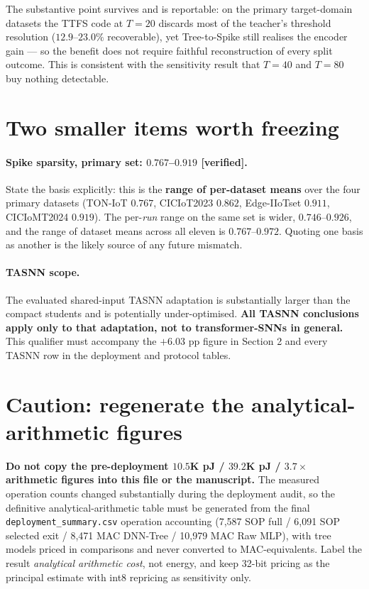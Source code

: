 \noindent The substantive point survives and is reportable: on the primary target-domain
datasets the TTFS code at $T=20$ discards most of the teacher's threshold resolution
($12.9$--$23.0\%$ recoverable), yet Tree-to-Spike still realises the encoder gain --- so
the benefit does not require faithful reconstruction of every split outcome. This is
consistent with the sensitivity result that $T=40$ and $T=80$ buy nothing detectable.

\section*{Two smaller items worth freezing}

\paragraph{Spike sparsity, primary set: $0.767$--$0.919$ \textup{[verified]}.} State the
basis explicitly: this is the \textbf{range of per-dataset means} over the four primary
datasets (TON-IoT $0.767$, CICIoT2023 $0.862$, Edge-IIoTset $0.911$, CICIoMT2024
$0.919$). The per-\emph{run} range on the same set is wider, $0.746$--$0.926$, and the
range of dataset means across all eleven is $0.767$--$0.972$. Quoting one basis as another
is the likely source of any future mismatch.

\paragraph{TASNN scope.} The evaluated shared-input TASNN adaptation is substantially
larger than the compact students and is potentially under-optimised. \textbf{All TASNN
conclusions apply only to that adaptation, not to transformer-SNNs in general.} This
qualifier must accompany the $+6.03$ pp figure in Section 2 and every TASNN row in the
deployment and protocol tables.

\section*{$\!$Caution: regenerate the analytical-arithmetic figures}

\textbf{Do not copy the pre-deployment $10.5$K pJ / $39.2$K pJ / $3.7\times$ arithmetic
figures into this file or the manuscript.} The measured operation counts changed
substantially during the deployment audit, so the definitive analytical-arithmetic table
must be generated from the final \texttt{deployment\_summary.csv} operation accounting
(7{,}587 SOP full / 6{,}091 SOP selected exit / 8{,}471 MAC DNN-Tree /
10{,}979 MAC Raw MLP), with tree models priced in comparisons and never converted to
MAC-equivalents. Label the result \emph{analytical arithmetic cost}, not energy, and keep
32-bit pricing as the principal estimate with int8 repricing as sensitivity only.

